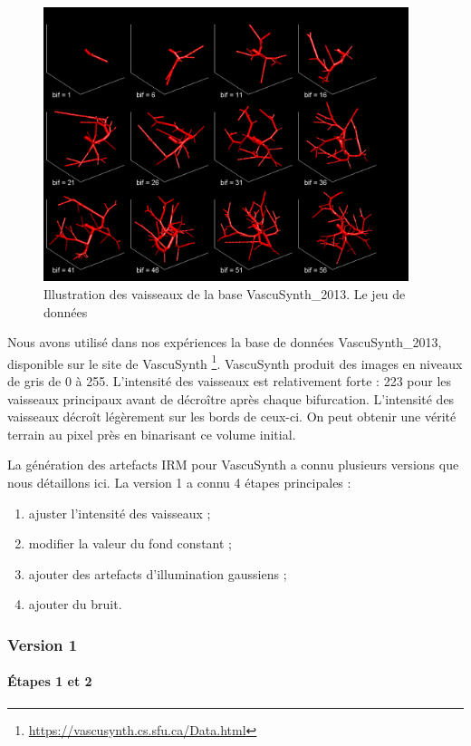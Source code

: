 \begin{figure}[!ht]
  \centering
  \includegraphics[height=8cm]{Images/snapVascu.png}
  
  \caption{Illustration des vaisseaux de la base VascuSynth\_2013. Le jeu de données }
  \label{fig:snap_vascu}
\end{figure}

Nous avons utilisé dans nos expériences la base de données VascuSynth\_2013, disponible sur le site de VascuSynth \footnote{\url{https://vascusynth.cs.sfu.ca/Data.html}}. VascuSynth produit des images en niveaux de gris de 0 à 255. L'intensité des vaisseaux est relativement forte : 223 pour les vaisseaux principaux avant de décroître après chaque bifurcation. L'intensité des vaisseaux décroît légèrement sur les bords de ceux-ci. On peut obtenir une vérité terrain au pixel près en binarisant ce volume initial.

La génération des artefacts IRM pour VascuSynth a connu plusieurs versions que nous détaillons ici. La version 1 a connu 4 étapes principales :
\begin{enumerate}
\item ajuster l'intensité des vaisseaux ;
\item modifier la valeur du fond constant ; 
\item ajouter des artefacts d'illumination gaussiens ;
\item ajouter du bruit.
\end{enumerate}

\subsubsection{Version 1}
\paragraph{Étapes 1 et 2}

